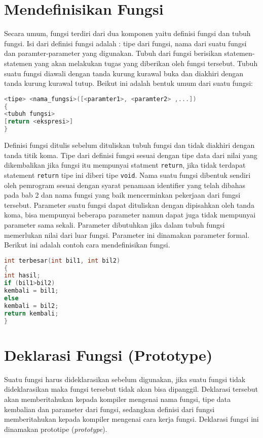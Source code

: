 \section{Mendefinisikan Fungsi}\label{mendefinisikan-fungsi}

Secara umum, fungsi terdiri dari dua komponen yaitu definisi fungsi dan
tubuh fungsi. Isi dari definisi fungsi adalah : tipe dari fungsi, nama
dari suatu fungsi dan paramter-parameter yang digunakan. Tubuh dari
fungsi berisikan statemen-statemen yang akan melakukan tugas yang
diberikan oleh fungsi tersebut. Tubuh suatu fungsi diawali dengan tanda
kurung kurawal buka dan diakhiri dengan tanda kurung kurawal tutup.
Beikut ini adalah bentuk umum dari suatu fungsi:

\begin{lstlisting}[language=c++, numbers=none]
<tipe> <nama_fungsi>([<paramter1>, <paramter2> ,...])
{
<tubuh fungsi>
[return <ekspresi>]
}
\end{lstlisting}

Definisi fungsi ditulis sebelum dituliskan tubuh fungsi dan tidak
diakhiri dengan tanda titik koma. Tipe dari definisi fungsi sesuai
dengan tipe data dari nilai yang dikembalikan jika fungsi itu mempunyai
statment \texttt{return}, jika tidak terdapat statement \texttt{return}
tipe ini diberi tipe \texttt{void}. Nama suatu fungsi dibentuk sendiri
oleh pemrogram sesuai dengan syarat penamaan identifier yang telah
dibahas pada bab 2 dan nama fungsi yang baik mencerminkan pekerjaan dari
fungsi tersebut. Parameter suatu fungsi dapat dituliskan dengan
dipisahkan oleh tanda koma, bisa mempunyai beberapa parameter namun
dapat juga tidak mempunyai parameter sama sekali. Parameter dibutuhkan
jika dalam tubuh fungsi memerlukan nilai dari luar fungsi. Parameter ini
dinamakan parameter formal. Berikut ini adalah contoh cara
mendefinisikan fungsi.

\begin{lstlisting}[language=c++, numbers=none]
int terbesar(int bil1, int bil2)
{
int hasil;
if (bil1>bil2)
kembali = bil1;
else
kembali = bil2;
return kembali;
}
\end{lstlisting}

\section{Deklarasi Fungsi (Prototype)}\label{deklarasi-fungsi-prototype}

Suatu fungsi harus dideklarasikan sebelum digunakan, jika suatu fungsi
tidak dideklarasikan maka fungsi tersebut tidak akan bisa dipanggil.
Deklarasi tersebut akan memberitahukan kepada kompiler mengenai nama
fungsi, tipe data kembalian dan parameter dari fungsi, sedangkan
definisi dari fungsi memberitahukan kepada kompiler mengenai cara kerja
fungsi. Deklarasi fungsi ini dinamakan prototipe (\emph{prototype}).

